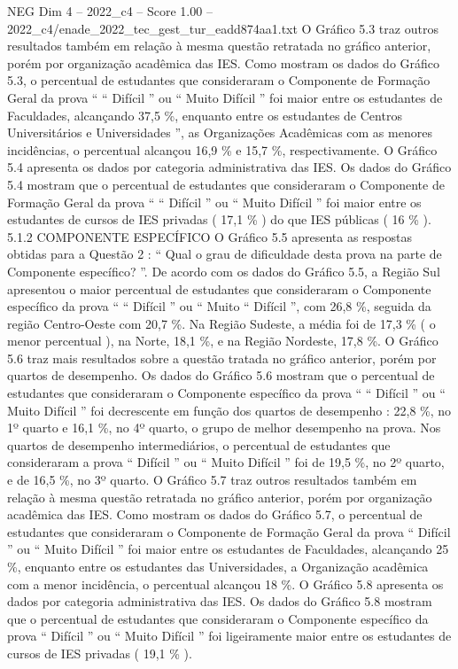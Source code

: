 \begin{textsample}{NEG Dim 4 – 2022\_c4 – Score 1.00 – 2022\_c4/enade\_2022\_tec\_gest\_tur\_eadd874aa1.txt}
O Gráfico 5.3 traz outros resultados também em relação à mesma questão retratada no gráfico anterior, porém por organização acadêmica das IES.
Como mostram os dados do Gráfico 5.3, o percentual de estudantes que consideraram o Componente de Formação Geral da prova “ “ Difícil ” ou “ Muito Difícil ” foi maior entre os estudantes de Faculdades, alcançando 37,5 \%, enquanto entre os estudantes de Centros Universitários e Universidades ”, as Organizações Acadêmicas com as menores incidências, o percentual alcançou 16,9 \% e 15,7 \%, respectivamente.
O Gráfico 5.4 apresenta os dados por categoria administrativa das IES.
Os dados do Gráfico 5.4 mostram que o percentual de estudantes que consideraram o Componente de Formação Geral da prova “ “ Difícil ” ou “ Muito Difícil ” foi maior entre os estudantes de cursos de IES privadas ( 17,1 \% ) do que IES públicas ( 16 \% ). 5.1.2 COMPONENTE ESPECÍFICO O Gráfico 5.5 apresenta as respostas obtidas para a Questão 2 : “ Qual o grau de dificuldade desta prova na parte de Componente específico? ”.
De acordo com os dados do Gráfico 5.5, a Região Sul apresentou o maior percentual de estudantes que consideraram o Componente específico da prova “ “ Difícil ” ou “ Muito “ Difícil ”, com 26,8 \%, seguida da região Centro-Oeste com 20,7 \%.
Na Região Sudeste, a média foi de 17,3 \% ( o menor percentual ), na Norte, 18,1 \%, e na Região Nordeste, 17,8 \%.
O Gráfico 5.6 traz mais resultados sobre a questão tratada no gráfico anterior, porém por quartos de desempenho.
Os dados do Gráfico 5.6 mostram que o percentual de estudantes que consideraram o Componente específico da prova “ “ Difícil ” ou “ Muito Difícil ” foi decrescente em função dos quartos de desempenho : 22,8 \%, no 1º quarto e 16,1 \%, no 4º quarto, o grupo de melhor desempenho na prova.
Nos quartos de desempenho intermediários, o percentual de estudantes que consideraram a prova “ Difícil ” ou “ Muito Difícil ” foi de 19,5 \%, no 2º quarto, e de 16,5 \%, no 3º quarto.
O Gráfico 5.7 traz outros resultados também em relação à mesma questão retratada no gráfico anterior, porém por organização acadêmica das IES.
Como mostram os dados do Gráfico 5.7, o percentual de estudantes que consideraram o Componente de Formação Geral da prova “ Difícil ” ou “ Muito Difícil ” foi maior entre os estudantes de Faculdades, alcançando 25 \%, enquanto entre os estudantes das Universidades, a Organização acadêmica com a menor incidência, o percentual alcançou 18 \%.
O Gráfico 5.8 apresenta os dados por categoria administrativa das IES.
Os dados do Gráfico 5.8 mostram que o percentual de estudantes que consideraram o Componente específico da prova “ Difícil ” ou “ Muito Difícil ” foi ligeiramente maior entre os estudantes de cursos de IES privadas ( 19,1 \% ).

\end{textsample}
